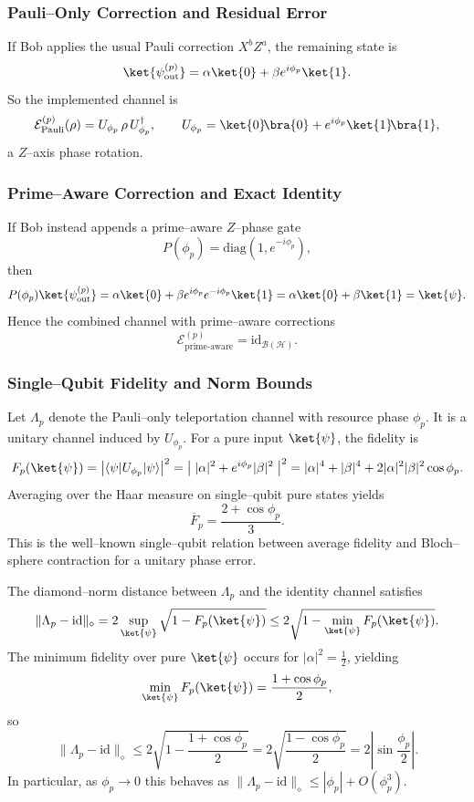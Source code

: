 \documentclass[11pt]{article}
\begin{document}
\subsubsection{Pauli–Only Correction and Residual Error}

If Bob applies the usual Pauli correction $X^b Z^a$, the remaining state is
\[
  \ket{\psi_{\text{out}}^{(p)}}
  = \alpha\ket{0} + \beta e^{i\phi_p}\ket{1}.
\]
So the implemented channel is
\[
  \mathcal{E}^{(p)}_{\text{Pauli}}(\rho)
  = U_{\phi_p} \, \rho \, U_{\phi_p}^\dagger,
  \qquad
  U_{\phi_p} = \ket{0}\!\bra{0} + e^{i\phi_p}\ket{1}\!\bra{1},
\]
a $Z$–axis phase rotation.

\subsubsection{Prime–Aware Correction and Exact Identity}

If Bob instead appends a prime–aware $Z$–phase gate
\[
  P(\phi_p) = \mathrm{diag}(1,e^{-i\phi_p}),
\]
then
\[
  P(\phi_p)\ket{\psi_{\text{out}}^{(p)}}
  = \alpha\ket{0} + \beta e^{i\phi_p} e^{-i\phi_p}\ket{1}
  = \alpha\ket{0} + \beta\ket{1}
  = \ket{\psi}.
\]
Hence the combined channel with prime–aware corrections
\[
  \mathcal{E}^{(p)}_{\text{prime-aware}} = \mathrm{id}_{\mathcal{B}(\mathcal{H})}.
\]

\subsubsection{Single–Qubit Fidelity and Norm Bounds}

Let $\Lambda_p$ denote the Pauli–only teleportation channel with resource phase $\phi_p$. It is a unitary channel induced by $U_{\phi_p}$. For a pure input $\ket{\psi}$, the fidelity is
\[
  F_p(\ket{\psi})
  = \bigl|\langle\psi|U_{\phi_p}|\psi\rangle\bigr|^2
  = \bigl|\;|\alpha|^2 + e^{i\phi_p}|\beta|^2\;\bigr|^2
  = |\alpha|^4 + |\beta|^4 + 2|\alpha|^2|\beta|^2 \cos\phi_p.
\]
Averaging over the Haar measure on single–qubit pure states yields
\begin{equation}
  \label{eq:single-qubit-avg-fidelity}
  \overline{F}_p
  = \frac{2+\cos\phi_p}{3}.
\end{equation}
This is the well–known single–qubit relation between average fidelity and Bloch–sphere contraction for a unitary phase error.

The diamond–norm distance between $\Lambda_p$ and the identity channel satisfies
\[
  \|\Lambda_p - \mathrm{id}\|_\diamond
  = 2\sup_{\ket{\psi}} \sqrt{1 - F_p(\ket{\psi})}
  \le 2\sqrt{1 - \min_{\ket{\psi}} F_p(\ket{\psi})}.
\]
The minimum fidelity over pure $\ket{\psi}$ occurs for $|\alpha|^2=\tfrac12$, yielding
\[
  \min_{\ket{\psi}} F_p(\ket{\psi})
  = \frac{1+\cos\phi_p}{2},
\]
so
\begin{equation}
  \label{eq:single-qubit-diamond-bound}
  \|\Lambda_p - \mathrm{id}\|_\diamond
  \le 2\sqrt{1 - \frac{1+\cos\phi_p}{2}}
  = 2\sqrt{\frac{1-\cos\phi_p}{2}}
  = 2\left|\sin\frac{\phi_p}{2}\right|.
\end{equation}
In particular, as $\phi_p\to 0$ this behaves as $\|\Lambda_p - \mathrm{id}\|_\diamond \le |\phi_p| + O(\phi_p^3)$.
\end{document}
